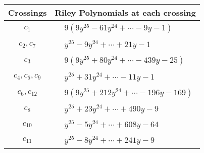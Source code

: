 \documentclass[1p]{elsarticle_modified}
\theoremstyle{definition}
\begin{document}
\begin{tabular}{m{50pt}|m{274pt}}
Crossings & \hspace{64pt}Riley Polynomials at each crossing \\
\hline $$\begin{aligned}c_{1}\end{aligned}$$&$\begin{aligned}
&9(9 y^{25}-61 y^{24}+\cdots-9 y-1)
\end{aligned}$\\
\hline $$\begin{aligned}c_{2},c_{7}\end{aligned}$$&$\begin{aligned}
&y^{25}-9 y^{24}+\cdots+21 y-1
\end{aligned}$\\
\hline $$\begin{aligned}c_{3}\end{aligned}$$&$\begin{aligned}
&9(9 y^{25}+80 y^{24}+\cdots-439 y-25)
\end{aligned}$\\
\hline $$\begin{aligned}c_{4},c_{5},c_{9}\end{aligned}$$&$\begin{aligned}
&y^{25}+31 y^{24}+\cdots-11 y-1
\end{aligned}$\\
\hline $$\begin{aligned}c_{6},c_{12}\end{aligned}$$&$\begin{aligned}
&9(9 y^{25}+212 y^{24}+\cdots-196 y-169)
\end{aligned}$\\
\hline $$\begin{aligned}c_{8}\end{aligned}$$&$\begin{aligned}
&y^{25}+23 y^{24}+\cdots+490 y-9
\end{aligned}$\\
\hline $$\begin{aligned}c_{10}\end{aligned}$$&$\begin{aligned}
&y^{25}-5 y^{24}+\cdots+608 y-64
\end{aligned}$\\
\hline $$\begin{aligned}c_{11}\end{aligned}$$&$\begin{aligned}
&y^{25}-8 y^{24}+\cdots+241 y-9
\end{aligned}$\\
\hline
\end{tabular}\\~\\
\end{document}
